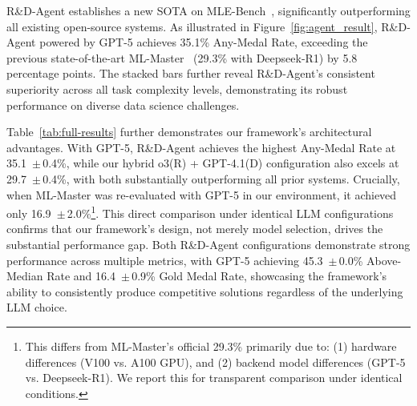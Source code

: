 R\&D-Agent establishes a new SOTA on MLE-Bench~\citep{chan2024mle-bench}, significantly outperforming all existing open-source systems. As illustrated in Figure~\ref{fig:agent_result}, R\&D-Agent powered by GPT-5 achieves 35.1\% Any-Medal Rate, exceeding the previous state-of-the-art ML-Master~\citep{liu2025ml} (29.3\% with Deepseek-R1) by 5.8 percentage points. The stacked bars further reveal R\&D-Agent's consistent superiority across all task complexity levels, demonstrating its robust performance on diverse data science challenges.

Table~\ref{tab:full-results} further demonstrates our framework's architectural advantages. With GPT-5, R\&D-Agent achieves the highest Any-Medal Rate at 35.1 \,$\pm$\,0.4\%, while our hybrid o3(R) + GPT-4.1(D) configuration also excels at 29.7 \,$\pm$\,0.4\%, with both substantially outperforming all prior systems. Crucially, when ML-Master was re-evaluated with GPT-5 in our environment, it achieved only 16.9 \,$\pm$\,2.0\%\footnote{This differs from ML-Master's official 29.3\% primarily due to: (1) hardware differences (V100 vs. A100 GPU), and (2) backend model differences (GPT-5 vs. Deepseek-R1). We report this for transparent comparison under identical conditions.}. This direct comparison under identical LLM configurations confirms that our framework's design, not merely model selection, drives the substantial performance gap. Both R\&D-Agent configurations demonstrate strong performance across multiple metrics, with GPT-5 achieving 45.3 \,$\pm$\,0.0\% Above-Median Rate and 16.4 \,$\pm$\,0.9\% Gold Medal Rate, showcasing the framework's ability to consistently produce competitive solutions regardless of the underlying LLM choice.


